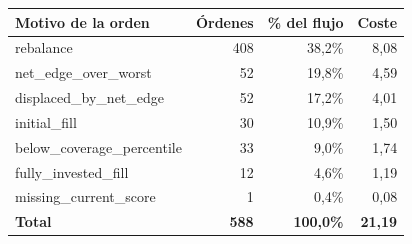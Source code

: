 \begin{tabular}{lrrr}
\toprule
Motivo de la orden & Órdenes & \% del flujo & Coste \\
\midrule
rebalance & 408 & 38,2\% & 8,08 \\
net\_edge\_over\_worst & 52 & 19,8\% & 4,59 \\
displaced\_by\_net\_edge & 52 & 17,2\% & 4,01 \\
initial\_fill & 30 & 10,9\% & 1,50 \\
below\_coverage\_percentile & 33 & 9,0\% & 1,74 \\
fully\_invested\_fill & 12 & 4,6\% & 1,19 \\
missing\_current\_score & 1 & 0,4\% & 0,08 \\
\textbf{Total} & \textbf{588} & \textbf{100,0\%} & \textbf{21,19} \\
\bottomrule
\end{tabular}
